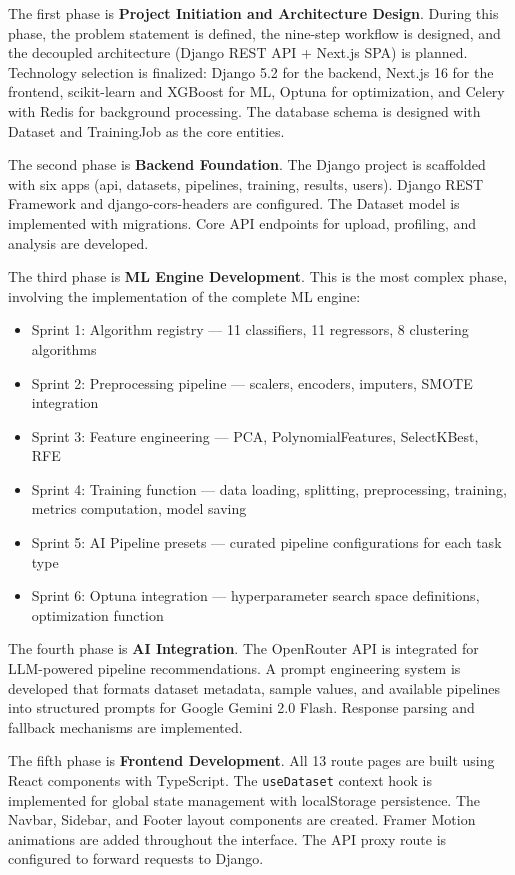 \documentclass[12pt,a4paper]{report}
\begin{document}
The first phase is \textbf{Project Initiation and Architecture Design}. During this phase, the problem statement is defined, the nine-step workflow is designed, and the decoupled architecture (Django REST API + Next.js SPA) is planned. Technology selection is finalized: Django 5.2 for the backend, Next.js 16 for the frontend, scikit-learn and XGBoost for ML, Optuna for optimization, and Celery with Redis for background processing. The database schema is designed with Dataset and TrainingJob as the core entities.

The second phase is \textbf{Backend Foundation}. The Django project is scaffolded with six apps (api, datasets, pipelines, training, results, users). Django REST Framework and django-cors-headers are configured. The Dataset model is implemented with migrations. Core API endpoints for upload, profiling, and analysis are developed.

The third phase is \textbf{ML Engine Development}. This is the most complex phase, involving the implementation of the complete ML engine:
\begin{itemize}
\item Sprint 1: Algorithm registry — 11 classifiers, 11 regressors, 8 clustering algorithms
\item Sprint 2: Preprocessing pipeline — scalers, encoders, imputers, SMOTE integration
\item Sprint 3: Feature engineering — PCA, PolynomialFeatures, SelectKBest, RFE
\item Sprint 4: Training function — data loading, splitting, preprocessing, training, metrics computation, model saving
\item Sprint 5: AI Pipeline presets — curated pipeline configurations for each task type
\item Sprint 6: Optuna integration — hyperparameter search space definitions, optimization function
\end{itemize}

The fourth phase is \textbf{AI Integration}. The OpenRouter API is integrated for LLM-powered pipeline recommendations. A prompt engineering system is developed that formats dataset metadata, sample values, and available pipelines into structured prompts for Google Gemini 2.0 Flash. Response parsing and fallback mechanisms are implemented.

The fifth phase is \textbf{Frontend Development}. All 13 route pages are built using React components with TypeScript. The \texttt{useDataset} context hook is implemented for global state management with localStorage persistence. The Navbar, Sidebar, and Footer layout components are created. Framer Motion animations are added throughout the interface. The API proxy route is configured to forward requests to Django.
\end{document}
